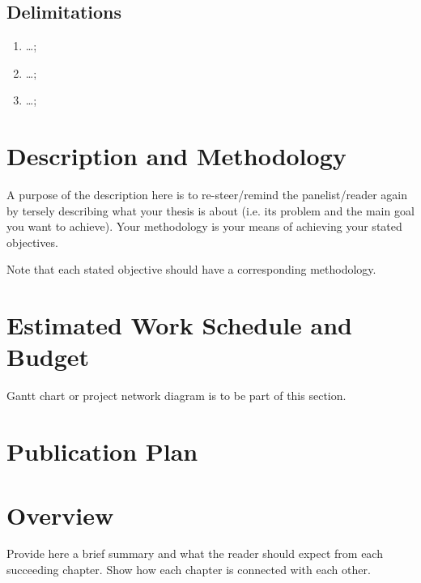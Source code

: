 \subsection{Delimitations}
\begin{enumerate}
	\item \ldots;
	
	\item \ldots;
	
	\item \ldots;	
\end{enumerate}

\section{Description and Methodology}

A purpose of the description here is to re-steer/remind the panelist/reader again by tersely describing what your thesis is about (i.e. its problem and the main goal you want to achieve). Your methodology is your means of achieving your stated objectives.

Note that each stated objective should have a corresponding methodology.

\textcolor[rgb]{0.75,0.75,0.75}{\blindtext}


\ifFinished
\else

\section{Estimated Work Schedule and Budget}

Gantt chart or project network diagram is to be part of this section.

\textcolor[rgb]{0.75,0.75,0.75}{\blindtext}

\ifPhD
\section{Publication Plan}
\textcolor[rgb]{0.75,0.75,0.75}{\blindtext}
\fi

\fi


\section{Overview}

Provide here a brief summary and what the reader should expect from each succeeding chapter.  Show how each chapter is connected with each other.


